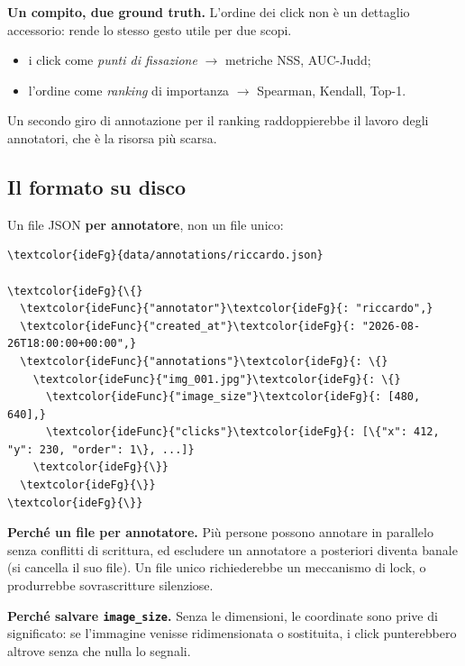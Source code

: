 \begin{nota}
\textbf{Un compito, due ground truth.} L'ordine dei click non è un dettaglio accessorio: rende lo
stesso gesto utile per due scopi.
\begin{itemize}
  \item i click come \emph{punti di fissazione} $\to$ metriche NSS, AUC-Judd;
  \item l'ordine come \emph{ranking} di importanza $\to$ Spearman, Kendall, Top-1.
\end{itemize}
Un secondo giro di annotazione per il ranking raddoppierebbe il lavoro degli annotatori, che è la
risorsa più scarsa.
\end{nota}

\subsection{Il formato su disco}

Un file JSON \textbf{per annotatore}, non un file unico:

\begin{idebox}
\begin{Verbatim}[commandchars=\\\{\},fontsize=\footnotesize]
\textcolor{ideFg}{data/annotations/riccardo.json}

\textcolor{ideFg}{\{}
  \textcolor{ideFunc}{"annotator"}\textcolor{ideFg}{: "riccardo",}
  \textcolor{ideFunc}{"created_at"}\textcolor{ideFg}{: "2026-08-26T18:00:00+00:00",}
  \textcolor{ideFunc}{"annotations"}\textcolor{ideFg}{: \{}
    \textcolor{ideFunc}{"img_001.jpg"}\textcolor{ideFg}{: \{}
      \textcolor{ideFunc}{"image_size"}\textcolor{ideFg}{: [480, 640],}
      \textcolor{ideFunc}{"clicks"}\textcolor{ideFg}{: [\{"x": 412, "y": 230, "order": 1\}, ...]}
    \textcolor{ideFg}{\}}
  \textcolor{ideFg}{\}}
\textcolor{ideFg}{\}}
\end{Verbatim}
\end{idebox}

\begin{nota}
\textbf{Perché un file per annotatore.} Più persone possono annotare in parallelo senza conflitti
di scrittura, ed escludere un annotatore a posteriori diventa banale (si cancella il suo file).
Un file unico richiederebbe un meccanismo di lock, o produrrebbe sovrascritture silenziose.

\medskip
\textbf{Perché salvare \texttt{image\_size}.} Senza le dimensioni, le coordinate sono prive di
significato: se l'immagine venisse ridimensionata o sostituita, i click punterebbero altrove
senza che nulla lo segnali.
\end{nota}

